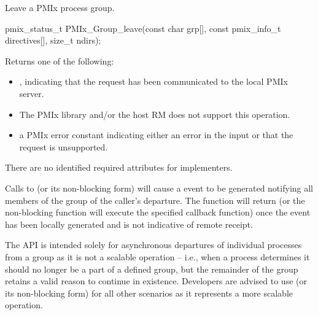Leave a \ac{PMIx} process group.

\format

\cspecificstart
\begin{codepar}
pmix_status_t
PMIx_Group_leave(const char grp[],
                 const pmix_info_t directives[],
                 size_t ndirs);
\end{codepar}
\cspecificend

\begin{arglist}
\end{arglist}

Returns one of the following:

\begin{itemize}
    \item {}, indicating that the request has been communicated to the local \ac{PMIx} server.
    \item {} The \ac{PMIx} library and/or the host \ac{RM} does not support this operation.
    \item a \ac{PMIx} error constant indicating either an error in the input or that the request is unsupported.
\end{itemize}

\reqattrstart
There are no identified required attributes for implementers.
\reqattrend


\descr

Calls to  (or its non-blocking form) will cause a  event to be generated notifying all members of the group of the caller’s departure. The function will return (or the non-blocking function will execute the specified callback function) once the event has been locally generated and is not indicative of remote receipt.

\adviceuserstart
The  API is intended solely for asynchronous departures of individual processes from a group as it is not a scalable operation – i.e., when a process determines it should no longer be a part of a defined group, but the remainder of the group retains a valid reason to continue in existence. Developers are advised to use  (or its non-blocking form) for all other scenarios as it represents a more scalable operation.
\adviceuserend

